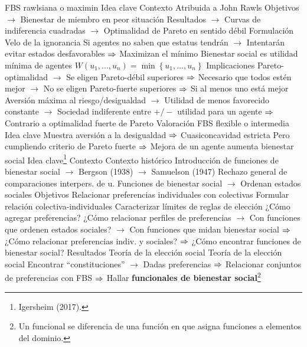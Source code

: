 \documentclass{nuevotema}
\begin{document}
\begin{esquemal}
			\3 FBS rawlsiana o maximin
				\4 Idea clave
				\4[] Contexto
				\4[] Atribuida a John Rawls
				\4[] Objetivos
				\4[] $\to$ Bienestar de miembro en peor situación
				\4[] Resultados
				\4[] $\to$ Curvas de indiferencia cuadradas
				\4[] $\to$ Optimalidad de Pareto en sentido débil
				\4 Formulación
				\4[] Velo de la ignorancia
				\4[] Si agentes no saben que estatus tendrán
				\4[] $\to$ Intentarán evitar estados desfavorables
				\4[] $\Rightarrow$ Maximizan el mínimo
				\4[] Bienestar social es utilidad mínima de agentes
				\4[] $W(u_1, ..., u_n) = \min \left\lbrace u_1, ..., u_n \right\rbrace$
				\4[] 
				\4 Implicaciones
				\4[] Pareto-optimalidad
				\4[] $\to$ Se eligen Pareto-débil superiores
				\4[] $\Rightarrow$ Necesario que todos estén mejor
				\4[] $\to$ No se eligen Pareto-fuerte superiores
				\4[] $\Rightarrow$ Si al menos uno está mejor
				\4 Aversión máxima al riesgo/desigualdad
				\4[]  $\to$ Utilidad de menos favorecido constante
				\4[] $\to$ Sociedad indiferente entre $+/-$ utilidad para un agente
				\4[] $\Rightarrow$ Contrario a optimalidad fuerte de Pareto
				\4 Valoración
			\3 FBS flexible o intermedia
				\4 Idea clave
				\4[] Muestra aversión a la desigualdad
				\4[] $\Rightarrow$ Cuasiconcavidad estricta
				\4[] Pero cumpliendo criterio de Pareto fuerte
				\4[] $\Rightarrow$ Mejora de un agente aumenta bienestar social
				\4[] 
	\1 
		\2 Idea clave\footnote{Igersheim (2017).}
			\3 Contexto
				\4 Contexto histórico
				\4[] Introducción de funciones de bienestar social
				\4[] $\to$ Bergson (1938)
				\4[] $\to$ Samuelson (1947)
				\4[] Rechazo general de comparaciones interpers. de u.
				\4 Funciones de bienestar social
				\4[] $\to$ Ordenan estados sociales
			\3 Objetivos
				\4 Relacionar preferencias individuales con colectivas
				\4 Formular relación colectiva-individuales
				\4 Caracterizar límites de reglas de elección
				\4 ¿Cómo agregar preferencias?
				\4 ¿Cómo relacionar perfiles de preferencias
				\4[] $\to$ Con funciones que ordenen estados sociales?
				\4[] $\to$ Con funciones que midan bienestar social
				\4[] $\Rightarrow$ ¿Cómo relacionar preferencias indiv. y sociales?
				\4[] $\Rightarrow$ ¿Cómo encontrar funciones de bienestar social?
			\3 Resultados
				\4 Teoría de la elección social
				\4 Teoría de la elección social
				\4[] Encontrar ``constituciones''
				\4[] $\to$ Dadas preferencias
				\4[] $\Rightarrow$ Relacionar conjuntos de preferencias con FBS
				\4[] $\Rightarrow$ Hallar \textbf{funcionales de bienestar social}\footnote{Un funcional se diferencia de una función en que asigna funciones a elementos del dominio.}

\end{esquemal}
\end{document}
